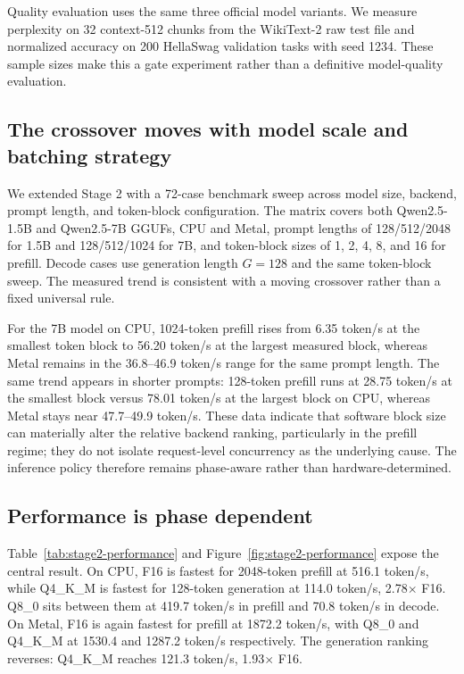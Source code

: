\documentclass[11pt]{article}
\begin{document}
Quality evaluation uses the same three official model variants. We measure
perplexity on 32 context-512 chunks from the WikiText-2 raw test file and normalized
accuracy on 200 HellaSwag validation tasks with seed 1234. These sample sizes make
this a gate experiment rather than a definitive model-quality evaluation.

\subsection{The crossover moves with model scale and batching strategy}
We extended Stage 2 with a 72-case benchmark sweep across model size, backend,
prompt length, and token-block configuration. The matrix covers both Qwen2.5-1.5B
and Qwen2.5-7B GGUFs, CPU and Metal, prompt lengths of 128/512/2048 for 1.5B and
128/512/1024 for 7B, and token-block sizes of 1, 2, 4, 8, and 16 for prefill.
Decode cases use generation length $G=128$ and the same token-block sweep. The
measured trend is consistent with a moving crossover rather than a fixed universal
rule.

For the 7B model on CPU, 1024-token prefill rises from 6.35 token/s at the
smallest token block to 56.20 token/s at the largest measured block, whereas Metal
remains in the 36.8--46.9 token/s range for the same prompt length. The same trend
appears in shorter prompts: 128-token prefill runs at 28.75 token/s at the
smallest block versus 78.01 token/s at the largest block on CPU, whereas Metal
stays near 47.7--49.9 token/s. These data indicate that software block size can
materially alter the relative backend ranking, particularly in the prefill regime;
they do not isolate request-level concurrency as the underlying cause. The
inference policy therefore remains phase-aware rather than hardware-determined.

\subsection{Performance is phase dependent}
Table~\ref{tab:stage2-performance} and Figure~\ref{fig:stage2-performance} expose
the central result. On CPU, F16 is fastest for 2048-token prefill at 516.1 token/s,
while Q4\_K\_M is fastest for 128-token generation at 114.0 token/s, 2.78$\times$
F16. Q8\_0 sits between them at 419.7 token/s in prefill and 70.8 token/s in
decode. On Metal, F16 is again fastest for prefill at 1872.2 token/s, with Q8\_0
and Q4\_K\_M at 1530.4 and 1287.2 token/s respectively. The generation ranking
reverses: Q4\_K\_M reaches 121.3 token/s, 1.93$\times$ F16.
\end{document}
